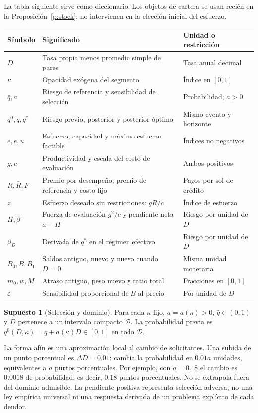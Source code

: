 \documentclass[11pt]{article}
\theoremstyle{definition}\newtheorem{assumption}{Supuesto}
\begin{document}
La tabla siguiente sirve como diccionario. Los objetos de cartera se usan
recién en la Proposición~\ref{p:stock}; no intervienen en la elección inicial
del esfuerzo.
\begin{center}\small
\begin{tabular}{@{}p{.15\linewidth}p{.51\linewidth}p{.27\linewidth}@{}}
\toprule Símbolo & Significado & Unidad o restricción\\\midrule
$D$ & Tasa propia menos promedio simple de pares & Tasa anual decimal\\
$\kappa$ & Opacidad exógena del segmento & Índice en $[0,1]$\\
$\bar q,a$ & Riesgo de referencia y sensibilidad de selección & Probabilidad; $a>0$\\
$q^0,q,q^*$ & Riesgo previo, posterior y posterior óptimo & Mismo evento y horizonte\\
$e,\bar e,u$ & Esfuerzo, capacidad y máximo esfuerzo factible & Índices no negativos\\
$g,c$ & Productividad y escala del costo de evaluación & Ambos positivos\\
$R,\bar R,F$ & Premio por desempeño, premio de referencia y costo fijo & Pagos por sol de crédito\\
$z$ & Esfuerzo deseado sin restricciones: $gR/c$ & Índice de esfuerzo\\
$H,\beta$ & Fuerza de evaluación $g^2/c$ y pendiente neta $a-H$ & Riesgo por unidad de $D$\\
$\beta_D$ & Derivada de $q^*$ en el régimen efectivo & Riesgo por unidad de $D$\\
$B_0,B,B_1$ & Saldos antiguo, nuevo y nuevo cuando $D=0$ & Misma unidad monetaria\\
$m_0,w,M$ & Atraso antiguo, peso nuevo y ratio total & Fracciones en $[0,1]$\\
$\varepsilon$ & Sensibilidad proporcional de $B$ al precio & Por unidad de $D$\\
\bottomrule
\end{tabular}
\end{center}

\begin{assumption}[Selección y dominio]\label{as:selection}
Para cada $\kappa$ fijo, $a=a(\kappa)>0$, $\bar q\in(0,1)$ y $D$ pertenece
a un intervalo compacto $\mathcal D$. La probabilidad previa es
$q^0(D,\kappa)=\bar q+a(\kappa)D\in[0,1]$ en todo $\mathcal D$.
\end{assumption}
La forma afín es una aproximación local al cambio de solicitantes. Una subida
de un punto porcentual es $\Delta D=0.01$: cambia la probabilidad en $0.01a$
unidades, equivalentes a $a$ puntos porcentuales. Por ejemplo, con $a=0.18$
el cambio es $0.0018$ de probabilidad, es decir, $0.18$ puntos porcentuales.
No se extrapola fuera del dominio admisible. La pendiente positiva representa
selección adversa, no una ley empírica universal ni una respuesta derivada de
un problema explícito de cada deudor.
\end{document}
